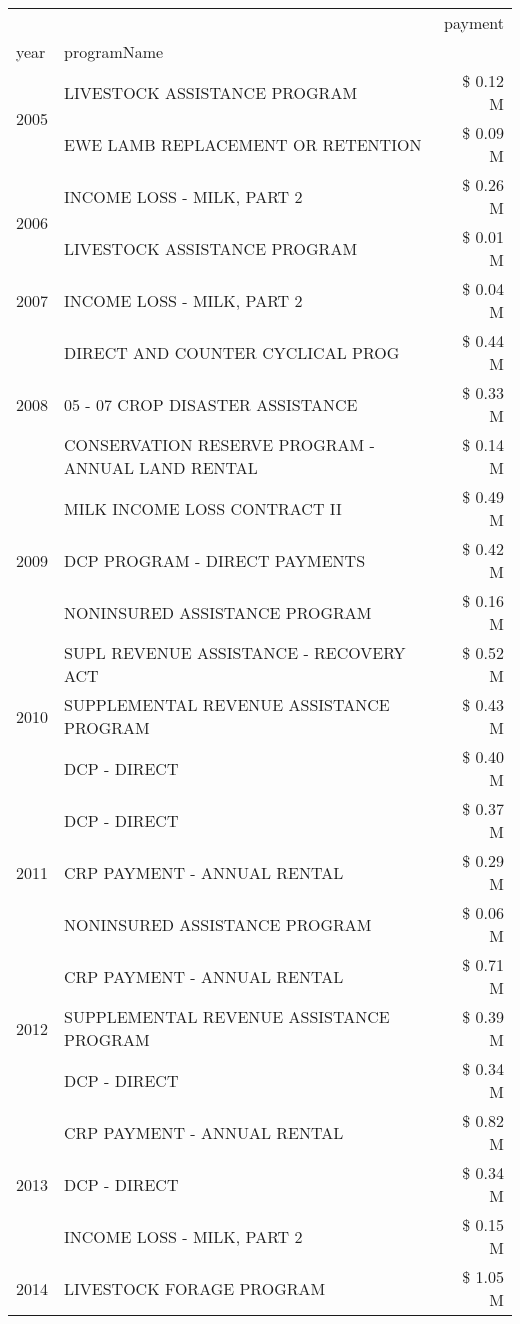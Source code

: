 \begin{tabular}{llr}
\toprule
 &  & payment \\
year & programName &  \\
\midrule
\multirow[t]{2}{*}{2005} & LIVESTOCK ASSISTANCE PROGRAM & \$ 0.12 M \\
 & EWE LAMB REPLACEMENT OR RETENTION & \$ 0.09 M \\
\cline{1-3}
\multirow[t]{2}{*}{2006} & INCOME LOSS - MILK, PART 2 & \$ 0.26 M \\
 & LIVESTOCK ASSISTANCE PROGRAM & \$ 0.01 M \\
\cline{1-3}
2007 & INCOME LOSS - MILK, PART 2 & \$ 0.04 M \\
\cline{1-3}
\multirow[t]{3}{*}{2008} & DIRECT AND COUNTER CYCLICAL PROG & \$ 0.44 M \\
 & 05 - 07 CROP DISASTER ASSISTANCE & \$ 0.33 M \\
 & CONSERVATION RESERVE PROGRAM - ANNUAL LAND RENTAL & \$ 0.14 M \\
\cline{1-3}
\multirow[t]{3}{*}{2009} & MILK INCOME LOSS CONTRACT II & \$ 0.49 M \\
 & DCP PROGRAM - DIRECT PAYMENTS & \$ 0.42 M \\
 & NONINSURED ASSISTANCE PROGRAM & \$ 0.16 M \\
\cline{1-3}
\multirow[t]{3}{*}{2010} & SUPL REVENUE ASSISTANCE - RECOVERY ACT & \$ 0.52 M \\
 & SUPPLEMENTAL REVENUE ASSISTANCE PROGRAM & \$ 0.43 M \\
 & DCP - DIRECT & \$ 0.40 M \\
\cline{1-3}
\multirow[t]{3}{*}{2011} & DCP - DIRECT & \$ 0.37 M \\
 & CRP PAYMENT - ANNUAL RENTAL & \$ 0.29 M \\
 & NONINSURED ASSISTANCE PROGRAM & \$ 0.06 M \\
\cline{1-3}
\multirow[t]{3}{*}{2012} & CRP PAYMENT - ANNUAL RENTAL & \$ 0.71 M \\
 & SUPPLEMENTAL REVENUE ASSISTANCE PROGRAM & \$ 0.39 M \\
 & DCP - DIRECT & \$ 0.34 M \\
\cline{1-3}
\multirow[t]{3}{*}{2013} & CRP PAYMENT - ANNUAL RENTAL & \$ 0.82 M \\
 & DCP - DIRECT & \$ 0.34 M \\
 & INCOME LOSS - MILK, PART 2 & \$ 0.15 M \\
\cline{1-3}
\multirow[t]{3}{*}{2014} & LIVESTOCK FORAGE PROGRAM & \$ 1.05 M \\

\end{tabular}
